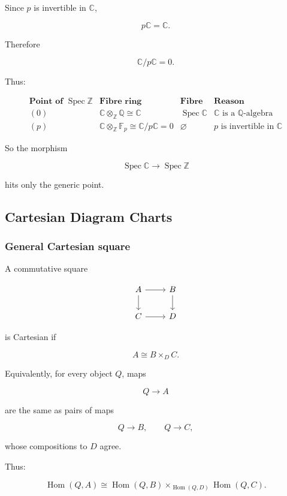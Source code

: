 \documentclass[12pt,a4paper]{article}
\theoremstyle{notespace}
\begin{document}
Since \(p\) is invertible in \(\mathbb{C}\),

\[
p\mathbb{C}=\mathbb{C}.
\]

Therefore

\[
\mathbb{C}/p\mathbb{C}=0.
\]

Thus:

\[
\begin{array}{c|c|c|c}
	\textbf{Point of }\operatorname{Spec}\mathbb{Z}
	&
	\textbf{Fibre ring}
	&
	\textbf{Fibre}
	&
	\textbf{Reason}
	\\
	\hline
	(0)
	&
	\mathbb{C}\otimes_{\mathbb{Z}}\mathbb{Q}\cong \mathbb{C}
	&
	\operatorname{Spec}\mathbb{C}
	&
	\mathbb{C}\text{ is a }\mathbb{Q}\text{-algebra}
	\\
	\hline
	(p)
	&
	\mathbb{C}\otimes_{\mathbb{Z}}\mathbb{F}_p\cong \mathbb{C}/p\mathbb{C}=0
	&
	\varnothing
	&
	p\text{ is invertible in }\mathbb{C}
\end{array}
\]

So the morphism

\[
\operatorname{Spec}\mathbb{C}\to \operatorname{Spec}\mathbb{Z}
\]

hits only the generic point.

\subsection{Cartesian Diagram Charts}

\subsubsection{General Cartesian square}

A commutative square

\[
\begin{tikzcd}
	A \arrow[r] \arrow[d]
	&
	B \arrow[d]
	\\
	C \arrow[r]
	&
	D
\end{tikzcd}
\]

is Cartesian if

\[
A\cong B\times_D C.
\]

Equivalently, for every object \(Q\), maps

\[
Q\to A
\]

are the same as pairs of maps

\[
Q\to B,
\qquad
Q\to C,
\]

whose compositions to \(D\) agree.

Thus:

\[
\operatorname{Hom}(Q,A)
\cong
\operatorname{Hom}(Q,B)
\times_{\operatorname{Hom}(Q,D)}
\operatorname{Hom}(Q,C).
\]
\end{document}
